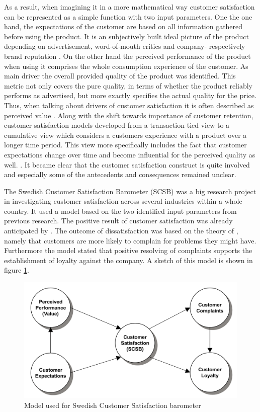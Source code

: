 As a result, when imagining it in a more mathematical way customer satisfaction can be represented as a simple function with two input parameters. One the one hand, the expectations of the customer are based on all information gathered before using the product. It is an subjectively built ideal picture of the product depending on advertisement, word-of-mouth critics and company- respectively brand reputation \cite{johnson2001evolution} \cite{neckel2015}. On the other hand the perceived performance of the product when using it comprises the whole consumption experience of the customer. As main driver the overall provided quality of the product was identified. This metric not only covers the pure quality, in terms of whether the product reliably performs as advertised, but more exactly specifies the actual quality for the price. Thus, when talking about drivers of customer satisfaction it is often described as perceived value \cite{johnson2001evolution} \cite{fornell1992national}. Along with the shift towards importance of customer retention, customer satisfaction models developed from a transaction tied view to a cumulative view which considers a customers experience with a product over a longer time period. This view more specifically includes the fact that customer expectations change over time and become influential for the perceived quality as well. \cite{johnson1996expectations}. It became clear that the customer satisfaction construct is quite involved and especially some of the antecedents and consequences remained unclear. 

The Swedish Customer Satisfaction Barometer (SCSB) was a big research project in investigating customer satisfaction across several industries within a whole country. It used a model based on the two identified input parameters from previous research. The positive result of customer satisfaction was already anticipated by \cite{bolton1998dynamic} \cite{gustafsson2005effects}. The outcome of dissatisfaction was based on the theory of \cite{hulett1971exit}, namely that customers are more likely to complain for problems they might have. Furthermore the model stated that positive resolving of complaints supports the establishment of loyalty against the company. A sketch of this model is shown in figure \ref{fig:scsb}.

\begin{figure}
	\centering
	\includegraphics[width=1.0\textwidth]{img/scsb.png}
	\caption{Model used for Swedish Customer Satisfaction barometer \cite{fornell1992national}}
	\label{fig:scsb}
\end{figure} 

